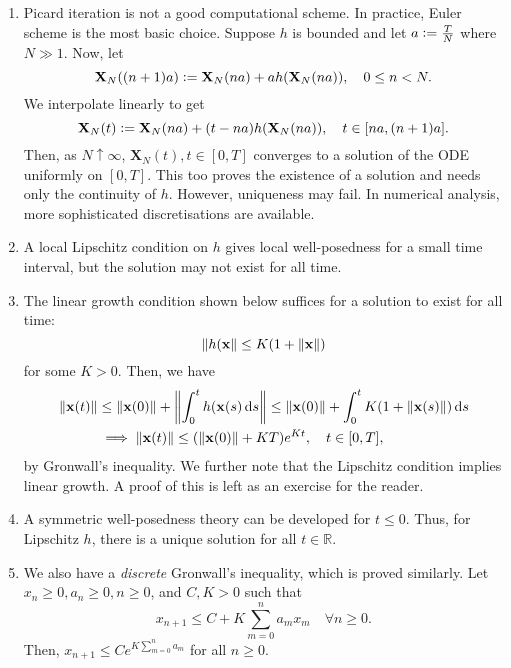 \begin{enumerate}
    \item Picard iteration is not a good computational scheme. In practice, Euler scheme is the most basic choice. Suppose $h$ is bounded and let $a \vcentcolon= \frac{T}{N}$ where $N \gg 1$. Now, let
    \[
        \mathbf{X}_N((n+1)a) \vcentcolon= \mathbf{X}_N(na) + ah(\mathbf{X}_N(na)), \quad 0 \leq n < N.
    \]
    We interpolate linearly to get
    \[
        \mathbf{X}_N(t) \vcentcolon= \mathbf{X}_N(na) + (t - na) h(\mathbf{X}_N(na)), \quad t \in [na, (n+1)a].
    \]
    Then, as $N \uparrow \infty$, $\mathbf{X}_N(t), t \in [0,T]$ converges to a solution of the ODE uniformly on $[0,T]$. This too proves the existence of a solution and needs only the continuity of $h$. However, uniqueness may fail. In numerical analysis, more sophisticated discretisations are available. 
    
    \item A local Lipschitz condition on $h$ gives local well-posedness for a small time interval, but the solution may not exist for all time.
    
    \item The linear growth condition shown below suffices for a solution to exist for all time:
    \[
        \norm{h(\mathbf{x}} \leq K(1 + \norm{\mathbf{x}})
    \]  
    for some $K > 0.$ Then, we have
    \begin{align*}
        \norm{\mathbf{x}(t)} &\leq \norm{\mathbf{x}(0)} + \norm{\int_0^t h(\mathbf{x}(s) \, \mathrm{d} s} \leq \norm{\mathbf{x}(0)} + \int_0^t K(1 + \norm{\mathbf{x}(s)}) \, \mathrm{d} s \\
        &\implies \norm{\mathbf{x}(t)} \leq (\norm{\mathbf{x}(0)} + KT) e^{Kt}, \quad t \in [0,T],
    \end{align*}
    by Gronwall's inequality. We further note that the Lipschitz condition implies linear growth. A proof of this is left as an exercise for the reader. 
    
    \item A symmetric well-posedness theory can be developed for $t \leq 0$. Thus, for Lipschitz $h$, there is a unique solution for all $t \in \mathbb{R}$.
    
    \item We also have a \emph{discrete} Gronwall's inequality, which is proved similarly. Let $x_n \geq 0, a_n \geq 0, n \geq 0$, and $C,K > 0$ such that
    \[
        x_{n+1} \leq C + K \sum_{m=0}^n a_mx_m \quad \forall n \geq 0.
    \]  
    Then, $x_{n+1} \leq C e^{K \sum_{m=0}^n a_m}$ for all $n \geq 0$.
\end{enumerate}

